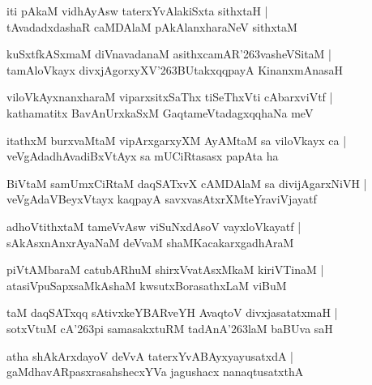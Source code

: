 \documentclass[twoside,12pt,openright]{book}
\def\S{\char'263}
\newcounter{shloka}[chapter]
\begin{document}
\begin{shloka}%
iti pAkaM vidhAyAsw taterxYvAlakiSxta sithxtaH |\\
tAvadadxdashaR caMDAlaM pAkAlanxharaNeV sithxtaM 
\end{shloka}

\begin{shloka}%
kuSxtfkASxmaM diVnavadanaM asithxcamAR\S vasheVSitaM |\\
tamAloVkayx divxjAgorxyXV\S BUtakxqqpayA KinanxmAnasaH 
\end{shloka}

\begin{shloka}%
viloVkAyxnanxharaM viparxsitxSaThx tiSeThxVti cAbarxviVtf |\\
kathamatitx BavAnUrxkaSxM GaqtameVtadagxqqhaNa meV 
\end{shloka}

\begin{shloka}%
itathxM burxvaMtaM vipArxgarxyXM AyAMtaM sa viloVkayx ca |\\
veVgAdadhAvadiBxVtAyx sa mUCiRtasasx papAta ha 
\end{shloka}

\begin{shloka}%
BiVtaM samUmxCiRtaM daqSATxvX cAMDAlaM sa divijAgarxNiVH |\\
veVgAdaVBeyxVtayx kaqpayA savxvasAtxrXMteYraviVjayatf
\end{shloka}

\begin{shloka}%
adhoVtithxtaM tameVvAsw viSuNxdAsoV vayxloVkayatf |\\
sAkAsxnAnxrAyaNaM deVvaM shaMKacakarxgadhAraM 
\end{shloka}

\begin{shloka}%
piVtAMbaraM catubARhuM shirxVvatAsxMkaM kiriVTinaM |\\
atasiVpuSapxsaMkAshaM kwsutxBorasathxLaM viBuM 
\end{shloka}

\begin{shloka}%
taM daqSATxqq sAtivxkeYBARveYH AvaqtoV divxjasatatxmaH |\\
sotxVtuM cA\S pi samasakxtuRM tadAnA\S laM baBUva saH 
\end{shloka}

\begin{shloka}%
atha shAkArxdayoV deVvA taterxYvABAyxyayusatxdA |\\
gaMdhavARpasxrasahshecxYVa jagushacx nanaqtusatxthA 
\end{shloka}
\end{document}
